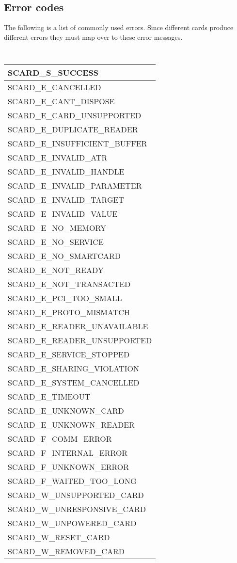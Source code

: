 \documentclass[a4paper,12pt]{article}
\begin{document}
\subsection{Error codes}
\label{Error codes}

The following is a list of commonly used errors. Since different
cards produce different errors they must map over to these error
messages.

{\tt
\begin{longtable}{|l|}
\hline
SCARD\_S\_SUCCESS \\
\hline
SCARD\_E\_CANCELLED \\
SCARD\_E\_CANT\_DISPOSE \\
SCARD\_E\_CARD\_UNSUPPORTED \\
SCARD\_E\_DUPLICATE\_READER \\
SCARD\_E\_INSUFFICIENT\_BUFFER \\
SCARD\_E\_INVALID\_ATR \\
SCARD\_E\_INVALID\_HANDLE \\
SCARD\_E\_INVALID\_PARAMETER \\
SCARD\_E\_INVALID\_TARGET \\
SCARD\_E\_INVALID\_VALUE \\
SCARD\_E\_NO\_MEMORY \\
SCARD\_E\_NO\_SERVICE \\
SCARD\_E\_NO\_SMARTCARD \\
SCARD\_E\_NOT\_READY \\
SCARD\_E\_NOT\_TRANSACTED \\
SCARD\_E\_PCI\_TOO\_SMALL \\
SCARD\_E\_PROTO\_MISMATCH \\
SCARD\_E\_READER\_UNAVAILABLE \\
SCARD\_E\_READER\_UNSUPPORTED \\
SCARD\_E\_SERVICE\_STOPPED \\
SCARD\_E\_SHARING\_VIOLATION \\
SCARD\_E\_SYSTEM\_CANCELLED \\
SCARD\_E\_TIMEOUT \\
SCARD\_E\_UNKNOWN\_CARD \\
SCARD\_E\_UNKNOWN\_READER \\
SCARD\_F\_COMM\_ERROR \\
SCARD\_F\_INTERNAL\_ERROR \\
SCARD\_F\_UNKNOWN\_ERROR \\
SCARD\_F\_WAITED\_TOO\_LONG \\
\hline
SCARD\_W\_UNSUPPORTED\_CARD \\
SCARD\_W\_UNRESPONSIVE\_CARD \\
SCARD\_W\_UNPOWERED\_CARD \\
SCARD\_W\_RESET\_CARD \\
SCARD\_W\_REMOVED\_CARD \\
\hline
\end{longtable}
}
\end{document}
